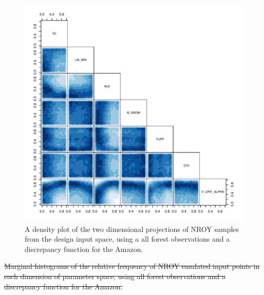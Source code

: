 \documentclass[esd, manuscript]{copernicus}
\providecommand{\DIFdel}[1]{{\protect\color{red}\sout{#1}}}                      %
\providecommand{\DIFdelbegin}{} %
\providecommand{\DIFdelend}{} %
\begin{document}
\begin{figure}[t]
\includegraphics[width=12cm]{graphics/plausible_disc_input_space.pdf}
\caption{A density plot of the two dimensional projections of NROY samples from the design input space, using a all forest observations and a discrepancy function for the Amazon.}
\label{fig:plausible_disc_input_space}
\end{figure}


\DIFdelbegin %
{%
\DIFdel{Marginal histograms of the relative frequency of NROY emulated input points in each dimension of parameter space, using all forest observations and a discrepancy function for the Amazon.}}

\DIFdelend %



\end{document}
